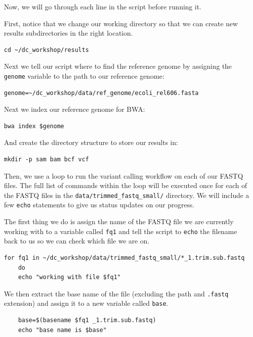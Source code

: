 \documentclass[
  letterpaper,
  DIV=11,
  numbers=noendperiod]{scrreprt}
\begin{document}
Now, we will go through each line in the script before running it.

First, notice that we change our working directory so that we can create
new results subdirectories in the right location.

\begin{verbatim}
cd ~/dc_workshop/results
\end{verbatim}

Next we tell our script where to find the reference genome by assigning
the \texttt{genome} variable to the path to our reference genome:

\begin{verbatim}
genome=~/dc_workshop/data/ref_genome/ecoli_rel606.fasta
\end{verbatim}

Next we index our reference genome for BWA:

\begin{verbatim}
bwa index $genome
\end{verbatim}

And create the directory structure to store our results in:

\begin{verbatim}
mkdir -p sam bam bcf vcf
\end{verbatim}

Then, we use a loop to run the variant calling workflow on each of our
FASTQ files. The full list of commands within the loop will be executed
once for each of the FASTQ files in the
\texttt{data/trimmed\_fastq\_small/} directory. We will include a few
\texttt{echo} statements to give us status updates on our progress.

The first thing we do is assign the name of the FASTQ file we are
currently working with to a variable called \texttt{fq1} and tell the
script to \texttt{echo} the filename back to us so we can check which
file we are on.

\begin{verbatim}
for fq1 in ~/dc_workshop/data/trimmed_fastq_small/*_1.trim.sub.fastq
    do
    echo "working with file $fq1"
\end{verbatim}

We then extract the base name of the file (excluding the path and
\texttt{.fastq} extension) and assign it to a new variable called
\texttt{base}.

\begin{verbatim}
    base=$(basename $fq1 _1.trim.sub.fastq)
    echo "base name is $base"
\end{verbatim}
\end{document}

